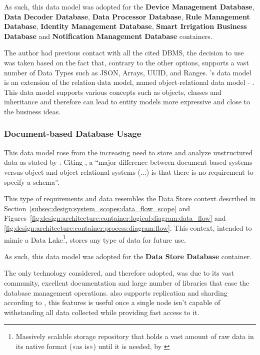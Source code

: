 As such, this data model was adopted for the \textbf{Device Management Database}, \textbf{Data Decoder Database}, \textbf{Data Processor Database}, \textbf{Rule Management Database}, \textbf{Identity Management Database}, \textbf{Smart Irrigation Business Database} and \textbf{Notification Management Database} containers. 

The author had previous contact with all the cited \gls{DBMS}, the decision to use  was taken based on the fact that, contrary to the other options,  supports a vast number of Data Types such as \gls{JSON}, Arrays, \gls{UUID}, and Ranges. 's data model is an extension of the relation data model, named object-relational data model - \cite{elmasri2000fundamentals}. This data model supports various concepts such as objects, classes and inheritance and therefore can lead to entity models more expressive and close to the business ideas.

\subsubsection{Document-based Database Usage}
\label{subsubsec:implementation:decisions:database:nosql}

This data model rose from the increasing need to store and analyze unstructured data as stated by \cite{miloslavskaya2016big}.  Citing \cite{elmasri2000fundamentals}, a ``major difference between document-based systems versus object and object-relational systems (...) is that there is no requirement to specify a schema''.

This type of requirements and data resembles the Data Store context described in Section~\ref{subsec:design:system_scopes:data_flow_scope} and Figures~\ref{fig:design:architecture:container:logical:diagram:data_flow} and \ref{fig:design:architecture:container:process:diagram:flow}. This context, intended to mimic a Data Lake\footnote{Massively scalable storage repository that holds a vast amount of raw data in its native format («as is») until it is needed, by \cite{miloslavskaya2016big}}, stores any type of data for future use.

As such, this data model was adopted for the \textbf{Data Store Database} container. 

The only technology considered, and therefore adopted, was  due to its vast community, excellent documentation and large number of libraries that ease the database management operations.  also supports replication and sharding according to \cite{elmasri2000fundamentals}, this features is useful once a single node isn't capable of withstanding all data collected while providing fast access to it.

